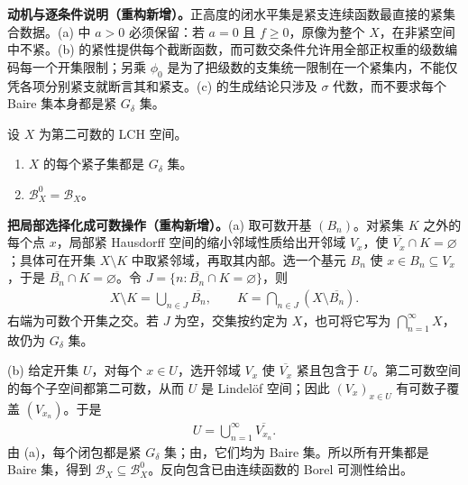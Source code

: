 \documentclass[../../main.tex]{subfiles}
\begin{document}
\begin{remark}
\textbf{动机与逐条件说明（重构新增）。}正高度的闭水平集是紧支连续函数最直接的紧集合数据。(a) 中 $a>0$ 必须保留：若 $a=0$ 且 $f\geqslant0$，原像为整个 $X$，在非紧空间中不紧。(b) 的紧性提供每个截断函数，而可数交条件允许用全部正权重的级数编码每一个开集限制；另乘 $\phi_0$ 是为了把级数的支集统一限制在一个紧集内，不能仅凭各项分别紧支就断言其和紧支。(c) 的生成结论只涉及 $\sigma$ 代数，而不要求每个 Baire 集本身都是紧 $G_\delta$ 集。
\end{remark}

\begin{exercise}\label{exercise:ch07-second-countable-baire}
设 $X$ 为第二可数的 LCH 空间。
\begin{enumerate}[label=\alph*.,ref=(\alph*)]
\item\label{item:ch07-second-countable-compact-gdelta} $X$ 的每个紧子集都是 $G_\delta$ 集。
\item\label{item:ch07-second-countable-baire-borel} $\mathscr B_X^0=\mathscr B_X$。
\end{enumerate}
\end{exercise}
\begin{solution}
\textbf{把局部选择化成可数操作（重构新增）。}(a) 取可数开基 $(B_n)$。对紧集 $K$ 之外的每个点 $x$，局部紧 Hausdorff 空间的缩小邻域性质给出开邻域 $V_x$，使 $\overline{V_x}\cap K=\varnothing$；具体可在开集 $X\setminus K$ 中取紧邻域，再取其内部。选一个基元 $B_n$ 使 $x\in B_n\subseteq V_x$，于是 $\overline{B_n}\cap K=\varnothing$。令 $J=\{n:\overline{B_n}\cap K=\varnothing\}$，则
\begin{align*}
X\setminus K=\bigcup_{n\in J}\overline{B_n},
\qquad K=\bigcap_{n\in J}(X\setminus\overline{B_n}).
\end{align*}
右端为可数个开集之交。若 $J$ 为空，交集按约定为 $X$，也可将它写为 $\bigcap_{n=1}^\infty X$，故仍为 $G_\delta$ 集。

(b) 给定开集 $U$，对每个 $x\in U$，选开邻域 $V_x$ 使 $\overline{V_x}$ 紧且包含于 $U$。第二可数空间的每个子空间都第二可数，从而 $U$ 是 Lindelöf 空间；因此 $(V_x)_{x\in U}$ 有可数子覆盖 $(V_{x_n})$。于是
\begin{align*}
U=\bigcup_{n=1}^\infty\overline{V_{x_n}}.
\end{align*}
由 (a)，每个闭包都是紧 $G_\delta$ 集；由，它们均为 Baire 集。所以所有开集都是 Baire 集，得到 $\mathscr B_X\subseteq\mathscr B_X^0$。反向包含已由连续函数的 Borel 可测性给出。
\end{solution}
\end{document}
